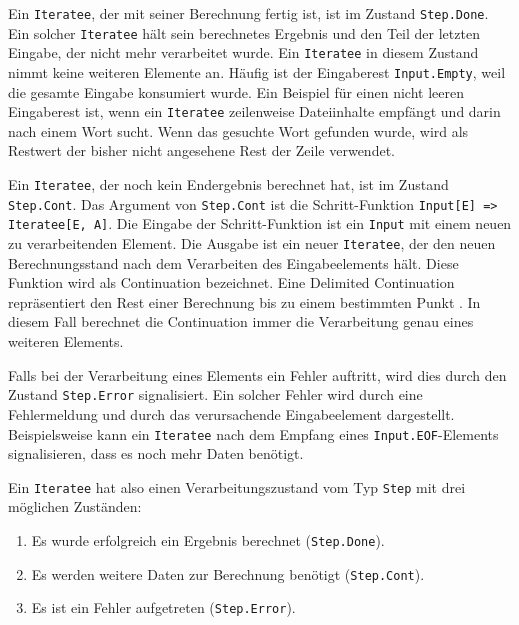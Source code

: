 Ein \lstinline|Iteratee|, der mit seiner Berechnung fertig ist, ist im Zustand \lstinline|Step.Done|.
Ein solcher \lstinline|Iteratee| hält sein berechnetes Ergebnis und den Teil der letzten Eingabe, der nicht mehr verarbeitet wurde.
Ein \lstinline|Iteratee| in diesem Zustand nimmt keine weiteren Elemente an.
Häufig ist der Eingaberest \lstinline|Input.Empty|, weil die gesamte Eingabe konsumiert wurde.
Ein Beispiel für einen nicht leeren Eingaberest ist, wenn ein \lstinline|Iteratee| zeilenweise Dateiinhalte empfängt und darin nach einem Wort sucht.
Wenn das gesuchte Wort gefunden wurde, wird als Restwert der bisher nicht angesehene Rest der Zeile verwendet.

Ein \lstinline|Iteratee|, der noch kein Endergebnis berechnet hat, ist im Zustand \lstinline|Step.Cont|.
Das Argument von \lstinline|Step.Cont| ist die Schritt-Funktion \lstinline[breaklines=true]|Input[E] => Iteratee[E, A]|.
Die Eingabe der Schritt-Funktion ist ein \lstinline|Input| mit einem neuen zu verarbeitenden Element.
Die Ausgabe ist ein neuer \lstinline|Iteratee|, der den neuen Berechnungsstand nach dem Verarbeiten des Eingabeelements hält.
Diese Funktion wird als Continuation bezeichnet.
Eine Delimited Continuation repräsentiert den Rest einer Berechnung bis zu einem bestimmten Punkt \cite[vgl.][S.~1]{continuations}.
In diesem Fall berechnet die Continuation immer die Verarbeitung genau eines weiteren Elements.

Falls bei der Verarbeitung eines Elements ein Fehler auftritt, wird dies durch den Zustand \lstinline|Step.Error| signalisiert.
Ein solcher Fehler wird durch eine Fehlermeldung und durch das verursachende Eingabeelement dargestellt.
Beispielsweise kann ein \lstinline|Iteratee| nach dem Empfang eines \lstinline|Input.EOF|-Elements signalisieren, dass es noch mehr Daten benötigt.

Ein \lstinline|Iteratee| hat also einen Verarbeitungszustand vom Typ \lstinline|Step| mit drei möglichen Zuständen:
\begin{enumerate}
  \item Es wurde erfolgreich ein Ergebnis berechnet (\lstinline|Step.Done|).
  \item Es werden weitere Daten zur Berechnung benötigt (\lstinline|Step.Cont|).
  \item Es ist ein Fehler aufgetreten (\lstinline|Step.Error|).
\end{enumerate}


